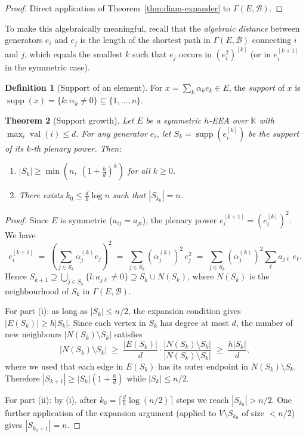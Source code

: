 \documentclass[12pt,a4paper]{amsart}
\newtheorem{theorem}{Theorem}[section]
\theoremstyle{definition}
\newtheorem{definition}[theorem]{Definition}
\DeclareMathOperator{\val}{val}
\DeclareMathOperator{\supp}{supp}
\newcommand{\K}{\mathbb{K}}
\newcommand{\EA}{E}          %
\newcommand{\natbasis}{\mathcal{B}}  %
\begin{document}
\begin{proof}
Direct application of Theorem~\ref{thm:diam-expander} to
$\varGamma(\EA,\natbasis)$.
\end{proof}

To make this algebraically meaningful, recall that the \emph{algebraic
distance} between generators $e_i$ and $e_j$ is the length of the
shortest path in $\varGamma(\EA,\natbasis)$ connecting $i$ and $j$,
which equals the smallest $k$ such that $e_j$ occurs in
$(e_i^2)^{[k]}$ (or in $e_i^{[k+1]}$ in the symmetric case).

\begin{definition}[Support of an element]\label{def:support}
For $x=\sum_k \alpha_k e_k\in\EA$, the \emph{support} of $x$ is
$\supp(x)=\{k : \alpha_k\ne 0\}\subseteq\{1,\ldots,n\}$.
\end{definition}

\begin{theorem}[Support growth]\label{thm:support-growth}
Let $\EA$ be a symmetric $h$-EEA over $\K$ with $\max_i\val(i)\le d$.
For any generator $e_i$, let $S_k=\supp(e_i^{[k]})$ be the support of
its $k$-th plenary power.  Then:
\begin{enumerate}[label=\normalfont(\roman*)]
  \item $|S_k|\ge\min\!\left(n,\; \left(1+\tfrac{h}{d}\right)^k\right)$
        for all $k\ge 0$.
  \item There exists $k_0\le\frac{d}{h}\log n$ such that
        $|S_{k_0}|=n$.
\end{enumerate}
\end{theorem}

\begin{proof}
Since $\EA$ is symmetric ($a_{ij}=a_{ji}$), the plenary power
$e_i^{[k+1]}=(e_i^{[k]})^2$.  We have
\[
  e_i^{[k+1]} \;=\; \left(\sum_{j\in S_k}\alpha_j^{(k)} e_j\right)^2
  \;=\; \sum_{j\in S_k} (\alpha_j^{(k)})^2\, e_j^2
  \;=\; \sum_{j\in S_k} (\alpha_j^{(k)})^2 \sum_\ell a_{j\ell}\,e_\ell.
\]
Hence $S_{k+1}\supseteq\bigcup_{j\in S_k} \{l : a_{j\ell}\ne 0\}
\supseteq S_k\cup N(S_k)$, where $N(S_k)$ is the neighbourhood of
$S_k$ in $\varGamma(\EA,\natbasis)$.

For part (i): as long as $|S_k|\le n/2$, the expansion condition gives
$|E(S_k)|\ge h|S_k|$.  Since each vertex in $S_k$ has degree at most
$d$, the number of new neighbours $|N(S_k)\setminus S_k|$ satisfies
\[
  |N(S_k)\setminus S_k| \;\ge\; \frac{|E(S_k)|}{d}\cdot
  \frac{|N(S_k)\setminus S_k|}{|N(S_k)\setminus S_k|}
  \;\ge\; \frac{h|S_k|}{d},
\]
where we used that each edge in $E(S_k)$ has its outer endpoint in
$N(S_k)\setminus S_k$.  Therefore
$|S_{k+1}|\ge|S_k|\left(1+\frac{h}{d}\right)$ while
$|S_k|\le n/2$.

For part (ii): by (i), after $k_0=\lceil\frac{d}{h}\log(n/2)\rceil$
steps we reach $|S_{k_0}|> n/2$.  One further application of the
expansion argument (applied to $V\setminus S_{k_0}$ of size $<n/2$)
gives $|S_{k_0+1}|=n$.
\end{proof}
\end{document}
